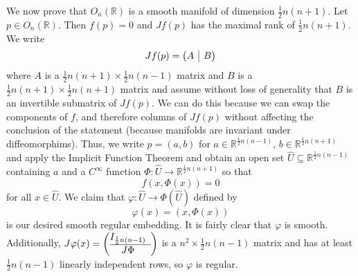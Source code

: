 \documentclass{../../../tex-setup/eh-homework}
\begin{document}
\begin{question}{40}
        We now prove that \(O_n(\mathbb{R})\) is a smooth manifold of dimension \(\frac{1}{2}n(n+1)\). Let \(p \in O_n(\mathbb{R})\). Then \(f(p) = 0\) and \(Jf(p)\) has the maximal rank of \(\frac{1}{2}n(n+1)\). We write
        \[
            Jf(p) = \left( \begin{array}{@{}c|c@{}}
                A & B
            \end{array} \right) 
        \]
        where \(A\) is a \(\frac{1}{2}n(n+1) \times \frac{1}{2}n(n-1)\) matrix and \(B\) is a \(\frac{1}{2}n(n+1) \times \frac{1}{2}n(n+1)\) matrix and assume without loss of generality that \(B\) is an invertible submatrix of \(Jf(p)\). We can do this because we can swap the components of \(f\), and therefore columns of \(Jf(p)\) without affecting the conclusion of the statement (because manifolds are invariant under diffeomorphims). Thus, we write \(p = (a,b)\) for \(a \in \mathbb{R}^{\frac{1}{2}n(n-1)}\), \(b \in \mathbb{R}^{\frac{1}{2}n(n+1)}\) and apply the Implicit Function Theorem and obtain an open set \(\hat{U} \subseteq \mathbb{R}^{\frac{1}{2}n(n-1)}\) containing \(a\) and a \(C^{\infty}\) function \(\Phi : \hat{U} \to \mathbb{R}^{\frac{1}{2}n(n+1)}\) so that
        \[
            f(x, \Phi(x)) = 0
        \]
        for all \(x \in \hat{U}\). We claim that \(\varphi: \hat{U} \to \Phi (\hat{U})\) defined by
        \[
            \varphi (x) = (x, \Phi (x))
        \]
        is our desired smooth regular embedding. It is fairly clear that \(\varphi\) is smooth. Additionally, \(J \varphi (x) = \left( \begin{array}{@{}cc@{}}
            I_{\frac{1}{2}n(n-1)} \\
            \hline
            J\Phi
        \end{array} \right) \) is a \(n^2 \times \frac{1}{2}n(n-1)\) matrix and has at least \(\frac{1}{2}n(n-1)\) linearly independent rows, so \(\varphi\) is regular.
    \end{question}
\end{document}
